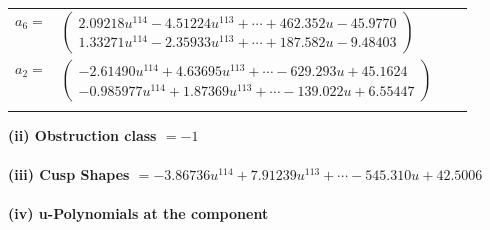 \documentclass[1p]{elsarticle_modified}
\theoremstyle{definition}
\begin{document}
\begin{tabular}{m{7pt} m{180pt} m{7pt} m{180pt} }
\flushright $a_{6}=$&$\begin{pmatrix}2.09218 u^{114}-4.51224 u^{113}+\cdots+462.352 u-45.9770\\1.33271 u^{114}-2.35933 u^{113}+\cdots+187.582 u-9.48403\end{pmatrix}$ \\
\flushright $a_{2}=$&$\begin{pmatrix}-2.61490 u^{114}+4.63695 u^{113}+\cdots-629.293 u+45.1624\\-0.985977 u^{114}+1.87369 u^{113}+\cdots-139.022 u+6.55447\end{pmatrix}$\\&\end{tabular}
\flushleft \textbf{(ii) Obstruction class $= -1$}\\~\\
\flushleft \textbf{(iii) Cusp Shapes $= -3.86736 u^{114}+7.91239 u^{113}+\cdots-545.310 u+42.5006$}\\~\\
\newpage\renewcommand{\arraystretch}{1}
\flushleft \textbf{(iv) u-Polynomials at the component}\newline \\
\end{document}
